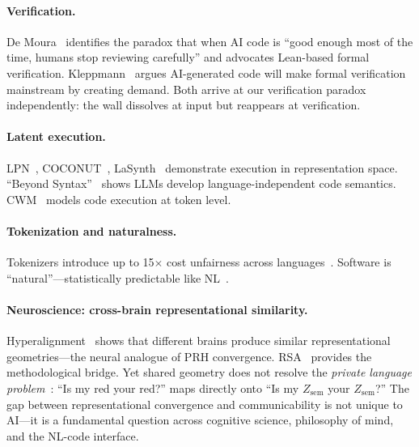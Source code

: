 \documentclass[11pt]{article}
\theoremstyle{definition}
\newcommand{\Zsem}{Z_{\text{sem}}}
\begin{document}
\paragraph{Verification.}
De Moura~\cite{demoura2026verify} identifies the paradox that when AI code is ``good enough most of the time, humans stop reviewing carefully'' and advocates Lean-based formal verification. Kleppmann~\cite{kleppmann2025formalverify} argues AI-generated code will make formal verification mainstream by creating demand. Both arrive at our verification paradox independently: the wall dissolves at input but reappears at verification.

\paragraph{Latent execution.}
LPN~\cite{macfarlane2025lpn}, COCONUT~\cite{hao2024coconut}, LaSynth~\cite{chen2021lasynth} demonstrate execution in representation space. ``Beyond Syntax''~\cite{beyondsyntax2025} shows LLMs develop language-independent code semantics. CWM~\cite{metafair2025cwm} models code execution at token level.

\paragraph{Tokenization and naturalness.}
Tokenizers introduce up to 15$\times$ cost unfairness across languages~\cite{petrov2024tokenizers}. Software is ``natural''---statistically predictable like NL~\cite{hindle2012naturalness}.

\paragraph{Neuroscience: cross-brain representational similarity.}
Hyperalignment~\cite{haxby2011hyperalignment} shows that different brains produce similar representational geometries---the neural analogue of PRH convergence. RSA~\cite{kriegeskorte2008rsa} provides the methodological bridge. Yet shared geometry does not resolve the \emph{private language problem}~\cite{wittgenstein1953}: ``Is my red your red?'' maps directly onto ``Is my $\Zsem$ your $\Zsem$?'' The gap between representational convergence and communicability is not unique to AI---it is a fundamental question across cognitive science, philosophy of mind, and the NL-code interface.

\end{document}
